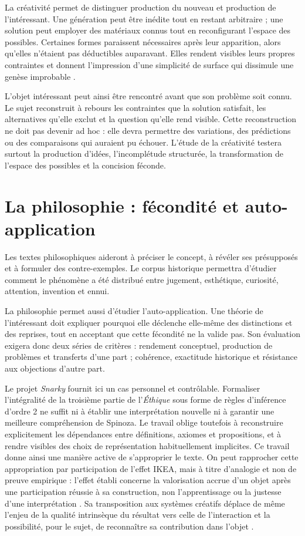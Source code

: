 \documentclass[11pt,a4paper]{article}
\begin{document}
La créativité permet de distinguer production du nouveau et production de
l'intéressant. Une génération peut être inédite tout en restant arbitraire ;
une solution peut employer des matériaux connus tout en reconfigurant l'espace
des possibles. Certaines formes paraissent nécessaires après leur apparition,
alors qu'elles n'étaient pas déductibles auparavant. Elles rendent visibles
leurs propres contraintes et donnent l'impression d'une simplicité de surface
qui dissimule une genèse improbable
\parencite{pachet2026impossibilite,pachet2027virtuosite}.

L'objet intéressant peut ainsi être rencontré avant que son problème soit
connu. Le sujet reconstruit à rebours les contraintes que la solution satisfait,
les alternatives qu'elle exclut et la question qu'elle rend visible. Cette
reconstruction ne doit pas devenir ad hoc : elle devra permettre des variations,
des prédictions ou des comparaisons qui auraient pu échouer. L'étude de la
créativité testera surtout la production d'idées, l'incomplétude structurée, la
transformation de l'espace des possibles et la concision féconde.

\section{La philosophie : fécondité et auto-application}

Les textes philosophiques aideront à préciser le concept, à révéler ses
présupposés et à formuler des contre-exemples. Le corpus historique permettra
d'étudier comment le phénomène a
été distribué entre jugement, esthétique, curiosité, attention, invention et
ennui.

La philosophie permet aussi d'étudier l'auto-application. Une théorie de
l'intéressant doit expliquer pourquoi elle déclenche elle-même des distinctions
et des reprises, tout en acceptant que cette fécondité ne la valide pas. Son
évaluation exigera donc deux séries de critères : rendement conceptuel,
production de problèmes et transferts d'une part ; cohérence, exactitude
historique et résistance aux objections d'autre part.

Le projet \emph{Snarky} fournit ici un cas personnel et contrôlable. Formaliser
l'intégralité de la troisième partie de l'\emph{Éthique} sous forme de règles
d'inférence d'ordre 2 ne suffit ni à établir une interprétation nouvelle ni à
garantir une meilleure compréhension de Spinoza. Le travail oblige toutefois à
reconstruire explicitement les dépendances entre définitions, axiomes et
propositions, et à rendre visibles des choix de représentation habituellement
implicites. Ce travail donne ainsi une manière active de s'approprier le texte.
On peut rapprocher cette appropriation par participation de l'effet IKEA,
mais à titre d'analogie et non de preuve empirique : l'effet établi concerne la
valorisation accrue d'un objet après une participation réussie à sa construction,
non l'apprentissage ou la justesse d'une interprétation
\parencite{norton2012ikea}. Sa transposition aux systèmes créatifs déplace de
même l'enjeu de la qualité intrinsèque du résultat vers celle de l'interaction et
la possibilité, pour le sujet, de reconnaître sa contribution dans l'objet
\parencite[152--153]{pachet2026generation}.
\end{document}
